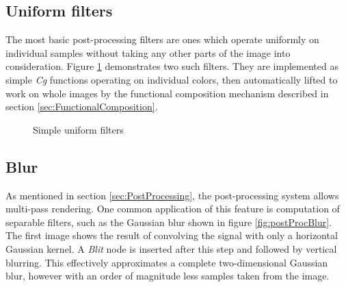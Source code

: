 \subsection{Uniform filters}

The most basic post-processing filters are ones which operate uniformly on individual samples without taking any other parts of the image into consideration. Figure \ref{fig:postProcSimple} demonstrates two such filters. They are implemented as simple \emph{Cg} functions operating on individual colors, then automatically lifted to work on whole images by the functional composition mechanism described in section \ref{sec:FunctionalComposition}.

\begin{figure}[h!]
  \centering
  \caption{Simple uniform filters}
  \label{fig:postProcSimple}
\end{figure}

\subsection{Blur}

As mentioned in section \ref{sec:PostProcessing}, the post-processing system allows multi-pass rendering. One common application of this feature is computation of separable filters, such as the Gaussian blur shown in figure \ref{fig:postProcBlur}. The first image shows the result of convolving the signal with only a horizontal Gaussian kernel. A \emph{Blit} node is inserted after this step and followed by vertical blurring. This effectively approximates a complete two-dimensional Gaussian blur, however with an order of magnitude less samples taken from the image.

